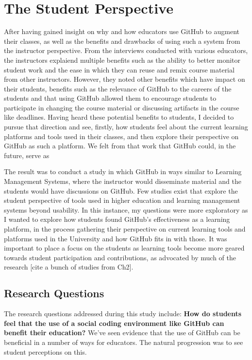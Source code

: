 \chapter{The Student Perspective}

After having gained insight on why and how educators use GitHub to augment their classes, as well as the benefits and drawbacks of using such a system from the instructor perspective. From the interviews conducted with various educators, the instructors explaiend multiple benefits such as the ability to better monitor student work and the ease in which they can reuse and remix course material from other instructors. However, they noted other benefits which have impact on their students, benefits such as the relevance of GitHub to the careers of the students and that using GitHub allowed them to encourage students to participate in changing the course material or discussing artifacts in the course like deadlines. Having heard these potential benefits to students, I decided to pursue that direction and see, firstly, how students feel about the current learning platforms and tools used in their classes, and then explore their perspective on GitHub as such a platform. We felt from that work that GitHub could, in the future, serve as

The result was to conduct a study in which GitHub in ways similar to Learning Management Systems, where the instructor would disseminate material and the students would have discussions on GitHub. Few studies exist that explore the student perspective of tools used in higher education and learning management systems beyond usability. In this instance, my questions were more exploratory as I wanted to explore how students found GitHub's effectiveness as a learning platform, in the process gathering their perspective on current learning tools and platforms used in the University and how GitHub fits in with those. It was important to place a focus on the students as learning tools become more geared towards student participation and contributions, as advocated by much of the research [cite a bunch of studies from Ch2].

\section{Research Questions}
The research questions addressed during this study include:
\bigskip
\textbf{How do students feel that the use of a social coding environment like GitHub can benefit their education?} We've seen evidence that the use of GitHub can be beneficial in a number of ways for educators. The natural progression was to see student perceptions on this.

